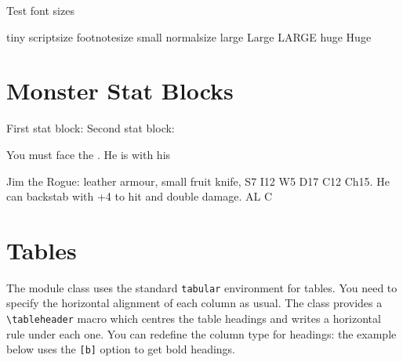 \documentclass[a4paper,serif]{module}
\begin{document}
%
%
%
%

Test font sizes

{\tiny tiny}
{\scriptsize scriptsize}
{\footnotesize footnotesize}
{\small small}
{\normalsize normalsize}
{\large large}
{\Large Large}
{\LARGE LARGE}
{\huge huge}
{\Huge Huge}

\section{Monster Stat Blocks}


First stat block:
Second stat block:

You must face the . 
He is with his 




\begin{statblockfreestyle}
Jim the Rogue: leather armour, small fruit knife, S7 I12 W5 D17 C12 Ch15. He can backstab with +4 to hit and double damage. AL C
\end{statblockfreestyle}

\section{Tables}

The module class uses the standard \verb|tabular| environment for tables. You need to specify the horizontal alignment of each column as 
usual. The class provides a \verb|\tableheader| macro which centres the table headings and writes a horizontal rule under each
one. You can redefine the column type for headings: the example below uses the \verb|[b]| option to get bold headings.
\end{document}
